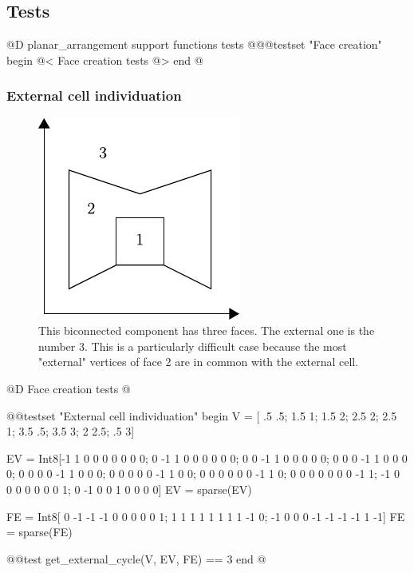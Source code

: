 \subsection{Tests}

@D planar\_arrangement support functions tests
@{@@testset "Face creation" begin
    @< Face creation tests @>
end
@}

\subsubsection{External cell individuation}
\begin{figure}[h]
    \centering
    \includegraphics{./img/ch2-externcell.pdf}
    \caption{This biconnected component has three faces. The external one is the number 3.
    This is a particularly difficult case because the most "external" vertices of face 2
    are in common with the external cell.}
\end{figure}

@D Face creation tests
@{@@testset "External cell individuation" begin
    V = [ .5 .5;  1.5   1;  1.5  2; 
         2.5  2;  2.5   1;  3.5 .5;
         3.5  3;    2 2.5;   .5  3]

    EV = Int8[-1  1  0  0  0  0  0  0  0;
               0 -1  1  0  0  0  0  0  0;
               0  0 -1  1  0  0  0  0  0;
               0  0  0 -1  1  0  0  0  0;
               0  0  0  0 -1  1  0  0  0;
               0  0  0  0  0 -1  1  0  0;
               0  0  0  0  0  0 -1  1  0;
               0  0  0  0  0  0  0 -1  1;
              -1  0  0  0  0  0  0  0  1;
               0 -1  0  0  1  0  0  0  0]
    EV = sparse(EV)
    
    FE = Int8[ 0 -1 -1 -1  0  0  0  0  0  1;
               1  1  1  1  1  1  1  1 -1  0;
              -1  0  0  0 -1 -1 -1 -1  1 -1]
    FE = sparse(FE)

    @@test get_external_cycle(V, EV, FE) == 3
end
@}

